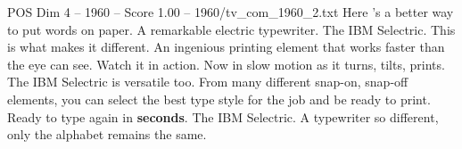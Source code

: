 \begin{textsample}{POS Dim 4 – 1960 – Score 1.00 – 1960/tv\_com\_1960\_2.txt}  \label{ex:f4_pos_012}
Here 's a better way to put words on paper.
A remarkable electric typewriter.
The IBM Selectric.
This is what makes it different.
An ingenious printing element that works faster than the eye can see.
Watch it in action.
Now in slow motion as it turns, tilts, prints.
The IBM Selectric is versatile too.
From many different snap-on, snap-off elements, you can select the best type style for the job and be ready to print.
Ready to type again in \textbf{seconds}.
The IBM Selectric.
A typewriter so different, only the alphabet remains the same.

\end{textsample}

